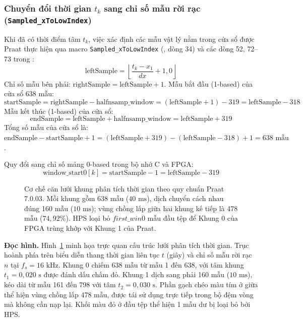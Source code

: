 \subsubsection*{Chuyển đổi thời gian $t_k$ sang chỉ số mẫu rời rạc (\texttt{Sampled\_xToLowIndex})}
Khi đã có thời điểm tâm $t_k$, việc xác định các mẫu vật lý nằm trong cửa sổ được Praat thực hiện qua macro \texttt{Sampled\_xToLowIndex} (, dòng 34) và các dòng 52, 72--73 trong :
\begin{equation}
\text{leftSample} = \left\lfloor \frac{t_k - x_1}{dx} + 1{,}0 \right\rfloor
\end{equation}
Chỉ số mẫu bên phải: $\text{rightSample} = \text{leftSample} + 1$.
Mẫu bắt đầu (1-based) của cửa sổ 638 mẫu:
\begin{equation}
\text{startSample} = \text{rightSample} - \text{halfnsamp\_window} = (\text{leftSample} + 1) - 319 = \text{leftSample} - 318
\end{equation}
Mẫu kết thúc (1-based) của cửa sổ:
\begin{equation}
\text{endSample} = \text{leftSample} + \text{halfnsamp\_window} = \text{leftSample} + 319
\end{equation}
Tổng số mẫu của cửa sổ là: $\text{endSample} - \text{startSample} + 1 = (\text{leftSample} + 319) - (\text{leftSample} - 318) + 1 = 638\text{ mẫu}$.

Quy đổi sang chỉ số mảng 0-based trong bộ nhớ C và FPGA:
\begin{equation}
\text{window\_start0}[k] = \text{startSample} - 1 = \text{leftSample} - 319
\end{equation}

\begin{figure}[t]
\centering
\resizebox{0.95\textwidth}{!}{}
\caption{Cơ chế căn lưới khung phân tích thời gian theo quy chuẩn Praat 7.0.03. Mỗi khung gồm 638 mẫu ($40\text{ ms}$), dịch chuyển cách nhau đúng 160 mẫu ($10\text{ ms}$); vùng chồng lấp giữa hai khung kế tiếp là 478 mẫu ($74{,}92\%$). HPS loại bỏ $first\_win0$ mẫu đầu tệp để Khung 0 của FPGA trùng khớp với Khung 1 của Praat.}
\label{fig:ch04_frame_grid}
\end{figure}

\textbf{Đọc hình.} Hình~\ref{fig:ch04_frame_grid} minh họa trực quan cấu trúc lưới phân tích thời gian. Trục hoành phía trên biểu diễn thang thời gian liên tục $t$ (giây) và chỉ số mẫu rời rạc $n$ tại $f_s = 16\text{ kHz}$. Khung 0 chiếm 638 mẫu từ mẫu 1 đến 638, với tâm khung $t_1 = 0{,}020\text{ s}$ được đánh dấu chấm đỏ. Khung 1 dịch sang phải 160 mẫu ($10\text{ ms}$), kéo dài từ mẫu 161 đến 798 với tâm $t_2 = 0{,}030\text{ s}$. Phần gạch chéo màu tím ở giữa thể hiện vùng chồng lấp 478 mẫu, được tái sử dụng trực tiếp trong bộ đệm vòng mà không cần nạp lại. Khối màu đỏ ở đầu tệp thể hiện 1 mẫu dư bị loại bỏ bởi HPS.

